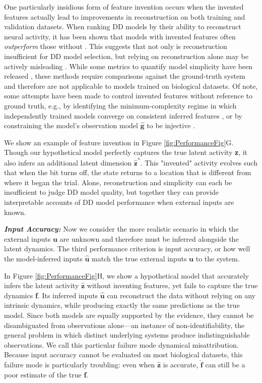 \documentclass{article}
\begin{document}
One particularly insidious form of feature invention occurs when the invented features actually lead to improvements in reconstruction on both training and validation datasets. When ranking DD models by their ability to reconstruct neural activity, it has been shown that models with invented features often \textit{outperform} those without \cite{versteeg2023expressive}. This suggests that not only is reconstruction insufficient for DD model selection, but relying on reconstruction alone may be actively misleading \cite{Genkin2020-ow}. While some metrics to quantify model simplicity have been released \cite{kim2021inferring, sedler_expressive_2022}, these methods require comparisons against the ground-truth system and therefore are not applicable to models trained on biological datasets. Of note, some attempts have been made to control invented features without reference to ground truth, e.g., by identifying the minimum-complexity regime in which independently trained models converge on consistent inferred features \cite{Genkin2020-ow}, or by constraining the model's observation model $\mathbf{\hat{g}}$ to be injective \cite{versteeg2023expressive}.

We show an example of feature invention in Figure \ref{fig:PerformanceFig}G. Though our hypothetical model perfectly captures the true latent activity \textbf{z}, it also infers an additional latent dimension $\mathbf{\hat{z}^*}$. This "invented" activity evolves such that when the bit turns off, the state returns to a location that is different from where it began the trial. Alone, reconstruction and simplicity can each be insufficient to judge DD model quality, but together they can provide interpretable accounts of DD model performance when external inputs are known.

\textbf{\textit{Input Accuracy:}}
Now we consider the more realistic scenario in which the external inputs $\textbf{u}$ are unknown and therefore must be inferred alongside the latent dynamics. The third performance criterion is input accuracy, or how well the model-inferred inputs $\mathbf{\hat{u}}$ match the true external inputs $\textbf{u}$ to the system.

In Figure \ref{fig:PerformanceFig}H, we show a hypothetical model that accurately infers the latent activity $\mathbf{\hat{z}}$ without inventing features, yet fails to capture the true dynamics \textbf{f}. Its inferred inputs $\mathbf{\hat{u}}$ can reconstruct the data without relying on any intrinsic dynamics, while producing exactly the same predictions as the true model. Since both models are equally supported by the evidence, they cannot be disambiguated from observations alone—an instance of non-identifiability, the general problem in which distinct underlying systems produce indistinguishable observations. We call this particular failure mode dynamical misattribution. Because input accuracy cannot be evaluated on most biological datasets, this failure mode is particularly troubling: even when $\mathbf{\hat{z}}$ is accurate, $\mathbf{\hat{f}}$ can still be a poor estimate of the true \textbf{f}.
\end{document}
